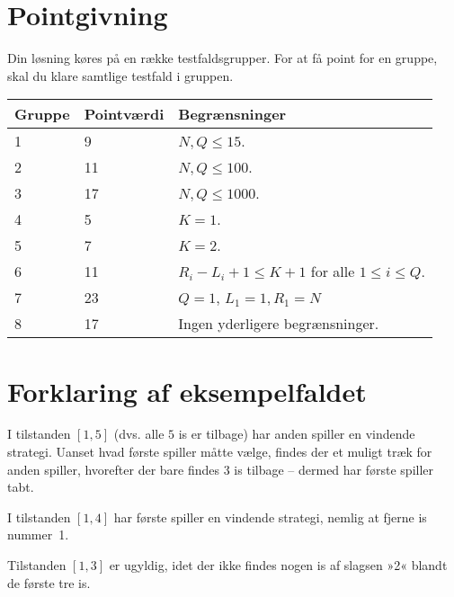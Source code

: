 \section*{Pointgivning}

Din løsning køres på en række testfaldsgrupper.
For at få point for en gruppe, skal du klare samtlige testfald i gruppen.

\noindent
\begin{tabular}{| l | l | l |}
\hline
Gruppe & Pointværdi & Begrænsninger \\ \hline
1     & 9          &  $N,Q \le 15$.\\ \hline
2     & 11         &  $N,Q \le 100$. \\ \hline
3     & 17         &  $N,Q \le 1000$. \\ \hline
4     & 5          &  $K=1$. \\ \hline
5     & 7          &  $K=2$. \\ \hline
6     & 11         &  $R_i - L_i + 1 \le K+1$ for alle $1 \le i \le Q$. \\ \hline
7     & 23         &  $Q=1$, $L_1=1, R_1=N$ \\ \hline
8     & 17         &  Ingen yderligere begrænsninger. \\ \hline
\end{tabular}

\section*{Forklaring af eksempelfaldet}

I tilstanden $[1,5]$ (dvs. alle $5$ is er tilbage) har anden spiller en vindende strategi.
Uanset hvad første spiller måtte vælge, findes der et muligt træk for anden spiller, hvorefter der bare findes $3$ is tilbage -- dermed har  første spiller tabt.

I tilstanden $[1,4]$ har første spiller  en vindende strategi, nemlig at fjerne is nummer~1.

Tilstanden $[1,3]$ er ugyldig, idet der ikke findes nogen is af slagsen »2« blandt de første tre is.

